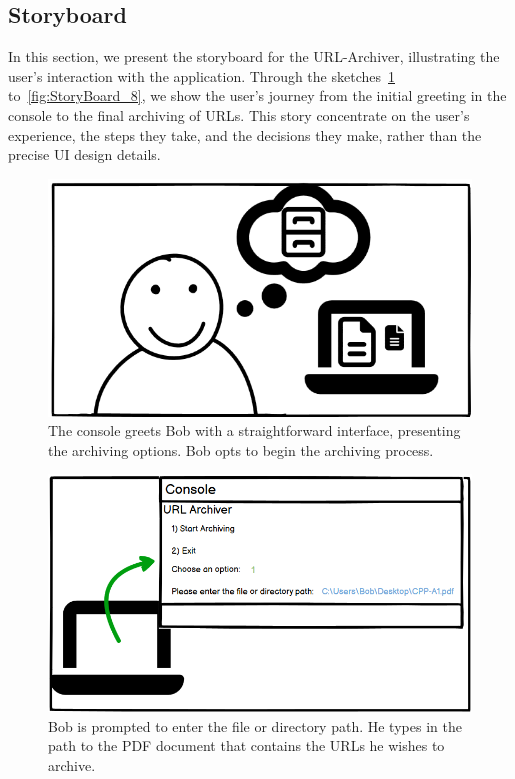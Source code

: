 \clearpage
\subsection{Storyboard}
In this section, we present the storyboard for the URL-Archiver, illustrating the user's interaction with the application.
Through the sketches~\ref{fig:StoryBoard_1} to~\ref{fig:StoryBoard_8}, we show the user's journey from the initial greeting in the console to the final archiving of URLs.
This story concentrate on the user's experience, the steps they take, and the decisions they make, rather than the precise UI design details.

\begin{figure}[h!]
    \centering
    \includegraphics[width=1\textwidth]{pictures/Story Board/StoryBoard_1}
    \caption{The console greets Bob with a straightforward interface, presenting the archiving options. Bob opts to begin the archiving process.}
    \label{fig:StoryBoard_1}
\end{figure}
\begin{figure}[h!]
    \centering
    \includegraphics[width=1\textwidth]{pictures/Story Board/StoryBoard_2}
    \caption{Bob is prompted to enter the file or directory path. He types in the path to the PDF document that contains the URLs he wishes to archive.}
    \label{fig:StoryBoard_2}
\end{figure}
